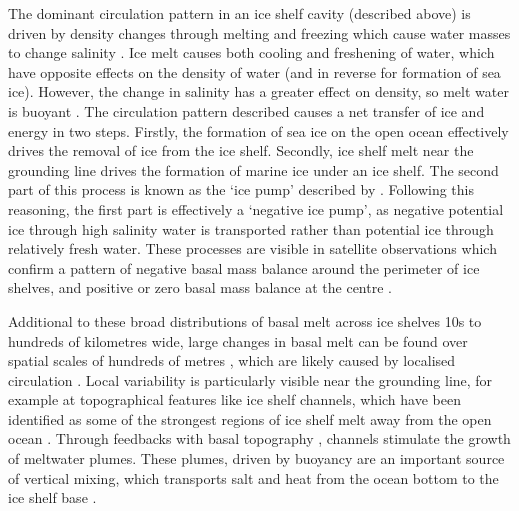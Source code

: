The dominant circulation pattern in an ice shelf cavity (described above) is driven by density changes through melting and freezing which cause water masses to change salinity \citep{jacobs1992melting}. Ice melt causes both cooling and freshening of water, which have opposite effects on the density of water (and in reverse for formation of sea ice). However, the change in salinity has a greater effect on density, so melt water is buoyant \citep{jenkins1991one}. The circulation pattern described causes a net transfer of ice and energy in two steps. Firstly, the formation of sea ice on the open ocean effectively drives the removal of ice from the ice shelf. Secondly, ice shelf melt near the grounding line drives the formation of marine ice under an ice shelf.
The second part of this process is known as the `ice pump' described by \cite{lewis1986ice}. Following this reasoning, the first part is effectively a `negative ice pump', as negative potential ice through high salinity water is transported rather than potential ice through relatively fresh water.
These processes are visible in satellite observations which confirm a pattern of negative basal mass balance around the perimeter of ice shelves, and positive or zero basal mass balance at the centre \citep[e.g.][]{rignot2013ice}. 



Additional to these broad distributions of basal melt across ice shelves 10s to hundreds of kilometres wide, large changes in basal melt can be found over spatial scales of hundreds of metres \citep[e.g.][]{marsh2016high,stanton2013channelized,stewart2019basal}, which are likely caused by localised circulation \citep{sergienko2013regular}. Local variability is particularly visible near the grounding line, for example at topographical features like ice shelf channels, which have been identified as some of the strongest regions of ice shelf melt away from the open ocean \citep[e.g.][]{marsh2016high, stanton2013channelized}. 
Through feedbacks with basal topography \citep{sergienko2013regular},  channels stimulate the growth of meltwater plumes. These plumes, driven by buoyancy are an important source of vertical mixing, which transports salt and heat from the ocean bottom to the ice shelf base \citep{macayeal1984thermohaline}.



